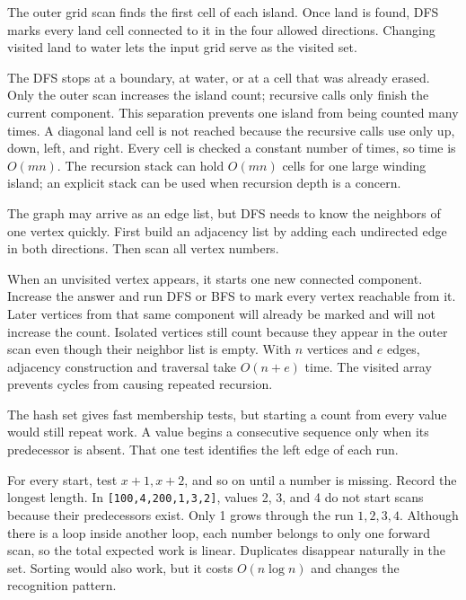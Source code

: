 \expandafter\def\csname sourcewalkthrough@41\endcsname{%
The outer grid scan finds the first cell of each island. Once land is found,
DFS marks every land cell connected to it in the four allowed directions.
Changing visited land to water lets the input grid serve as the visited set.

The DFS stops at a boundary, at water, or at a cell that was already erased.
Only the outer scan increases the island count; recursive calls only finish
the current component. This separation prevents one island from being counted
many times. A diagonal land cell is not reached because the recursive calls
use only up, down, left, and right. Every cell is checked a constant number of
times, so time is \(O(mn)\). The recursion stack can hold \(O(mn)\) cells for
one large winding island; an explicit stack can be used when recursion depth
is a concern.}

\expandafter\def\csname sourcewalkthrough@42\endcsname{%
The graph may arrive as an edge list, but DFS needs to know the neighbors of
one vertex quickly. First build an adjacency list by adding each undirected
edge in both directions. Then scan all vertex numbers.

When an unvisited vertex appears, it starts one new connected component.
Increase the answer and run DFS or BFS to mark every vertex reachable from it.
Later vertices from that same component will already be marked and will not
increase the count. Isolated vertices still count because they appear in the
outer scan even though their neighbor list is empty. With \(n\) vertices and
\(e\) edges, adjacency construction and traversal take \(O(n+e)\) time. The
visited array prevents cycles from causing repeated recursion.}

\expandafter\def\csname sourcewalkthrough@43\endcsname{%
The hash set gives fast membership tests, but starting a count from every value
would still repeat work. A value begins a consecutive sequence only when its
predecessor is absent. That one test identifies the left edge of each run.

For every start, test \(x+1,x+2\), and so on until a number is missing. Record
the longest length. In \texttt{[100,4,200,1,3,2]}, values 2, 3, and 4 do not
start scans because their predecessors exist. Only 1 grows through the run
\(1,2,3,4\). Although there is a loop inside another loop, each number belongs
to only one forward scan, so the total expected work is linear. Duplicates
disappear naturally in the set. Sorting would also work, but it costs
\(O(n\log n)\) and changes the recognition pattern.}

